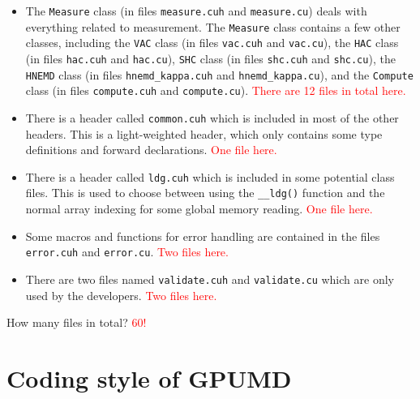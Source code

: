 \documentclass[12pt,a4paper]{report}
\begin{document}
\begin{itemize}
\item The \verb"Measure" class (in files \verb"measure.cuh" and \verb"measure.cu") deals with everything related to measurement. The \verb"Measure" class contains a few other classes, including the  \verb"VAC" class (in files \verb"vac.cuh" and \verb"vac.cu"), the \verb"HAC" class (in files \verb"hac.cuh" and \verb"hac.cu"), \verb"SHC" class (in files \verb"shc.cuh" and \verb"shc.cu"), the \verb"HNEMD" class (in files \verb"hnemd_kappa.cuh" and \verb"hnemd_kappa.cu"), and the \verb"Compute" class (in files \verb"compute.cuh" and \verb"compute.cu"). \textcolor{red}{There are 12 files in total here.}

\item There is a header called \verb"common.cuh" which is included in most of the other headers. This is a light-weighted header, which only contains some type definitions and forward declarations. \textcolor{red}{One file here.}

\item There is a header called \verb"ldg.cuh" which is included in some potential class files. This is used to choose between using the \verb"__ldg()" function and the normal array indexing for some global memory reading. \textcolor{red}{One file here.}

\item Some macros and functions for error handling are contained in the files \verb"error.cuh" and \verb"error.cu". \textcolor{red}{Two files here.}

\item There are two files named \verb"validate.cuh" and \verb"validate.cu" which are only used by the developers. \textcolor{red}{Two files here.}
\end{itemize}

How many files in total? \textcolor{red}{60!}


\section{Coding style of GPUMD}
\end{document}
